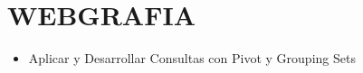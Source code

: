 \section{WEBGRAFIA} 

\begin{itemize}
\item Aplicar y Desarrollar  Consultas con Pivot y Grouping Sets




\end{itemize}